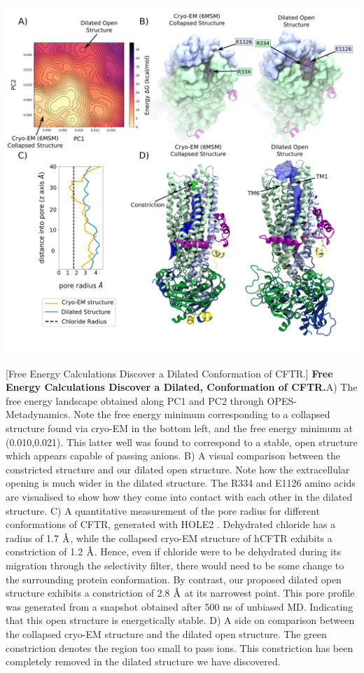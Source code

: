 	\begin{center}
		\includegraphics[width=1\textwidth]{figures/opening/summary_dilated_structure_1.pdf}
	\end{center}
	\begingroup
	\captionsetup{singlelinecheck = false, justification=raggedright}
	[Free Energy Calculations Discover a Dilated Conformation of CFTR.] {\textbf{Free Energy Calculations Discover a Dilated, Conformation of CFTR.}}{A) The free energy landscape obtained along PC1 and PC2 through OPES-Metadynamics. Note the free energy minimum corresponding to a collapsed structure found via cryo-EM in the bottom left, and the free energy minimum at (0.010,0.021). This latter well was found to correspond to a stable, open structure which appears capable of passing anions. B) A visual comparison between the constricted structure and our dilated open structure. Note how the extracellular opening is much wider in the dilated structure. The R334 and E1126 amino acids are visualised to show how they come into contact with each other in the dilated structure. C) A quantitative measurement of the pore radius for different conformations of CFTR, generated with HOLE2 \cite{smart1996}. Dehydrated chloride has a radius of 1.7 $\textup{\AA}$, while the collapsed cryo-EM structure of hCFTR exhibits a constriction of 1.2 $\textup{\AA}$. Hence, even if chloride were to be dehydrated during its migration through the selectivity filter, there would need to be some change to the surrounding protein conformation. By contrast, our proposed dilated open structure exhibits a constriction of 2.8 $\textup{\AA}$ at its  narrowest point. This pore profile was generated from a snapshot obtained after 500 ns of unbiased MD. Indicating that this open structure is energetically stable.  D) A side on comparison between the collapsed cryo-EM structure and the dilated open structure. The green constriction denotes the region too small to pass ions. This constriction has been completely removed in the dilated structure we have discovered. }
	\label{summary_FES}
	\endgroup


